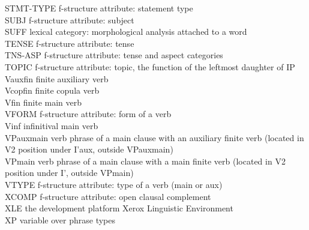\documentclass[output=paper]{langsci/langscibook}
\begin{document}
\begin{tabbing}
STMT-TYPE \> f-structure attribute: statement type\\
SUBJ \> f-structure attribute: subject\\
SUFF \> lexical category: morphological analysis attached to a word\\
TENSE \> f-structure attribute: tense\\
TNS-ASP \> f-structure attribute: tense and aspect categories\\
TOPIC \> f-structure attribute: topic, the function of the leftmost daughter of IP\\
Vauxfin \> finite auxiliary verb\\
Vcopfin \> finite copula verb\\
Vfin \> finite main verb\\
VFORM \> f-structure attribute: form of a verb\\
Vinf \> infinitival main verb\\
VPauxmain \> verb phrase of a main clause with an auxiliary finite verb (located in V2 position under I’aux, outside VPauxmain)\\
VPmain \> verb phrase of a main clause with a main finite verb (located in V2 position under I’, outside VPmain)\\
VTYPE \> f-structure attribute: type of a verb (main or aux)\\
XCOMP \> f-structure attribute: open clausal complement\\
XLE \> the development platform Xerox Linguistic Environment\\
XP \> variable over phrase types
\end{tabbing} 

{\sloppy\printbibliography[heading=subbibliography,notkeyword=this]}
\end{document}
